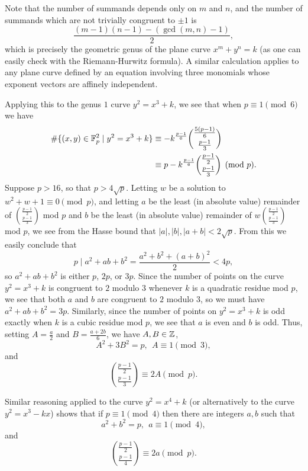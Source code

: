 Note that the number of summands depends only on $m$ and $n$, and the number of summands which are not trivially congruent to $\pm 1$ is 
\[
\frac{(m-1)(n-1)-(\gcd(m,n)-1)}{2},
\]
which is precisely the geometric genus of the plane curve $x^m + y^n = k$ (as one can easily check with the Riemann-Hurwitz formula). A similar calculation applies to any plane curve defined by an equation involving three monomials whose exponent vectors are affinely independent.

\begin{ex} Applying this to the genus $1$ curve $y^2 = x^3 + k$, we see that when $p \equiv 1 \pmod{6}$ we have
\begin{align*}
\#\{(x,y) \in \mathbb{F}_p^2\mid y^2 = x^3 + k\} &\equiv - k^{\frac{p-1}{6}}\binom{\tfrac{5(p-1)}{6}}{\tfrac{p-1}{3}}\\
&\equiv p - k^{\frac{p-1}{6}}\binom{\tfrac{p-1}{2}}{\tfrac{p-1}{3}} \pmod{p}.
\end{align*}
Suppose $p > 16$, so that $p > 4\sqrt{p}$. Letting $w$ be a solution to $w^2+w+1 \equiv 0 \pmod{p}$, and letting $a$ be the least (in absolute value) remainder of $\binom{\tfrac{p-1}{2}}{\tfrac{p-1}{3}}$ mod $p$ and $b$ be the least (in absolute value) remainder of $w\binom{\tfrac{p-1}{2}}{\tfrac{p-1}{3}}$ mod $p$, we see from the Hasse bound that $|a|, |b|, |a+b| < 2\sqrt{p}$. From this we easily conclude that
\[
p \mid a^2 + ab + b^2 = \frac{a^2 + b^2 + (a+b)^2}{2} < 4p,
\]
so $a^2 + ab + b^2$ is either $p$, $2p$, or $3p$. Since the number of points on the curve $y^2 = x^3 + k$ is congruent to $2$ modulo $3$ whenever $k$ is a quadratic residue mod $p$, we see that both $a$ and $b$ are congruent to $2$ modulo $3$, so we must have $a^2 + ab + b^2 = 3p$. Similarly, since the number of points on $y^2 = x^3 + k$ is odd exactly when $k$ is a cubic residue mod $p$, we see that $a$ is even and $b$ is odd. Thus, setting $A = \frac{a}{2}$ and $B = \frac{a+2b}{6}$, we have $A,B \in \mathbb{Z}$,
\[
A^2 + 3B^2 = p,\ \ A \equiv 1 \pmod{3},
\]
and
\[
\binom{\tfrac{p-1}{2}}{\tfrac{p-1}{3}} \equiv 2A \pmod{p}.
\]
\end{ex}

\begin{ex} Similar reasoning applied to the curve $y^2 = x^4 + k$ (or alternatively to the curve $y^2 = x^3 - kx$) shows that if $p \equiv 1 \pmod{4}$ then there are integers $a,b$ such that
\[
a^2 + b^2 = p,\ \ a \equiv 1 \pmod{4},
\]
and
\[
\binom{\tfrac{p-1}{2}}{\tfrac{p-1}{4}} \equiv 2a \pmod{p}.
\]
\end{ex}

